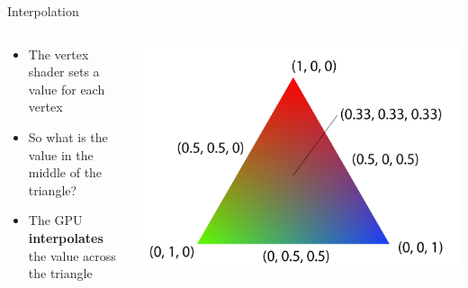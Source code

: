 \begin{frame}{Interpolation}
	\begin{columns}
		\begin{column}{0.5\textwidth}
			\begin{itemize}
				\pause\item The vertex shader sets a value for each vertex
				\pause\item So what is the value in the middle of the triangle?
				\pause\item The GPU \textbf{interpolates} the value across the triangle
			\end{itemize}
		\end{column}
		\begin{column}{0.45\textwidth}
			\pause\includegraphics[width=\textwidth]{interpolation}
		\end{column}
	\end{columns}
\end{frame}
